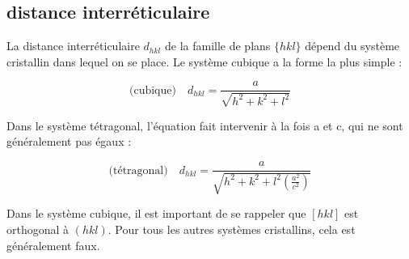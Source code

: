 \subsection{distance interréticulaire}

La distance interréticulaire $d_{hkl}$ de la famille de plans $\{hkl\}$ dépend du
système cristallin dans lequel on se place. Le système cubique a la forme la plus
simple :

\begin{equation}
    \text{(cubique)}\quad d_{hkl} = \frac{a}{\sqrt{h^2 + k^2 + l^2}}
\end{equation}

Dans le système tétragonal, l'équation fait intervenir à la fois a et c, qui ne
sont généralement pas égaux :

\begin{equation}
    \text{(tétragonal)}\quad d_{hkl} = \frac{a}{\sqrt{h^2 + k^2 + l^2
    \left(\frac{a^2}{c^2}\right) }}
\end{equation}

Dans le système cubique, il est important de se rappeler que $[hkl]$ est
orthogonal à $(hkl)$. Pour tous les autres systèmes cristallins, cela est
généralement faux.

